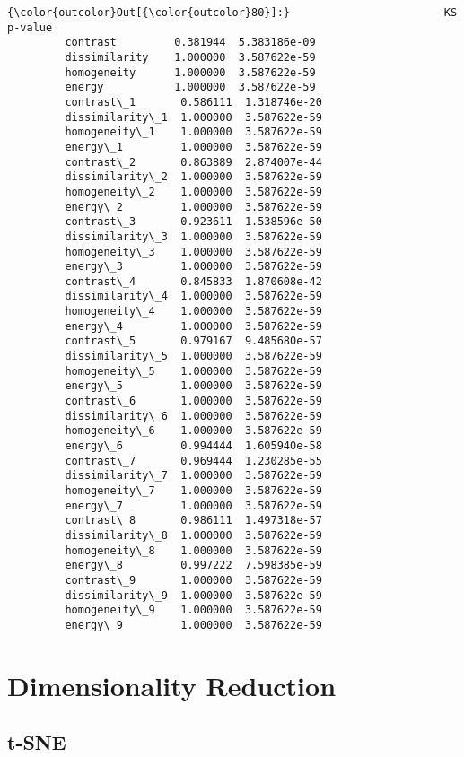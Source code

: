             \begin{Verbatim}[commandchars=\\\{\}]
{\color{outcolor}Out[{\color{outcolor}80}]:}                        KS       p-value
         contrast         0.381944  5.383186e-09
         dissimilarity    1.000000  3.587622e-59
         homogeneity      1.000000  3.587622e-59
         energy           1.000000  3.587622e-59
         contrast\_1       0.586111  1.318746e-20
         dissimilarity\_1  1.000000  3.587622e-59
         homogeneity\_1    1.000000  3.587622e-59
         energy\_1         1.000000  3.587622e-59
         contrast\_2       0.863889  2.874007e-44
         dissimilarity\_2  1.000000  3.587622e-59
         homogeneity\_2    1.000000  3.587622e-59
         energy\_2         1.000000  3.587622e-59
         contrast\_3       0.923611  1.538596e-50
         dissimilarity\_3  1.000000  3.587622e-59
         homogeneity\_3    1.000000  3.587622e-59
         energy\_3         1.000000  3.587622e-59
         contrast\_4       0.845833  1.870608e-42
         dissimilarity\_4  1.000000  3.587622e-59
         homogeneity\_4    1.000000  3.587622e-59
         energy\_4         1.000000  3.587622e-59
         contrast\_5       0.979167  9.485680e-57
         dissimilarity\_5  1.000000  3.587622e-59
         homogeneity\_5    1.000000  3.587622e-59
         energy\_5         1.000000  3.587622e-59
         contrast\_6       1.000000  3.587622e-59
         dissimilarity\_6  1.000000  3.587622e-59
         homogeneity\_6    1.000000  3.587622e-59
         energy\_6         0.994444  1.605940e-58
         contrast\_7       0.969444  1.230285e-55
         dissimilarity\_7  1.000000  3.587622e-59
         homogeneity\_7    1.000000  3.587622e-59
         energy\_7         1.000000  3.587622e-59
         contrast\_8       0.986111  1.497318e-57
         dissimilarity\_8  1.000000  3.587622e-59
         homogeneity\_8    1.000000  3.587622e-59
         energy\_8         0.997222  7.598385e-59
         contrast\_9       1.000000  3.587622e-59
         dissimilarity\_9  1.000000  3.587622e-59
         homogeneity\_9    1.000000  3.587622e-59
         energy\_9         1.000000  3.587622e-59
\end{Verbatim}

    \section{Dimensionality Reduction}\label{dimensionality-reduction}

\subsection{t-SNE}\label{t-sne}

